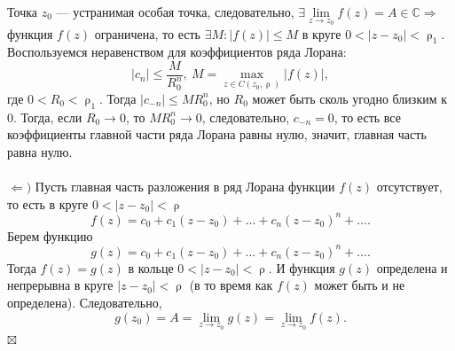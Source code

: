 \documentclass[a4paper, 12pt]{article}
\newenvironment{Proof} %
{\par\noindent{$\blacklozenge$}} %
{\hfill$\scriptstyle\boxtimes$}
\newcommand{\Cm}{\mathbb{C}}
\renewcommand{\leq}{\leqslant}
\renewcommand{\rho}{\uprho}
\begin{document}
\begin{enumerate}
\begin{Proof}
	Точка $z_0$ --- устранимая особая точка, следовательно, $\exists \lim\limits_{z\to z_0} f(z) = A\in \Cm\Rightarrow$ функция $f(z)$ ограничена, то есть $\exists M : |f(z)|\leq M$ в круге $0 < |z-z_0| < \rho _1$. Воспользуемся неравенством для коэффициентов ряда Лорана:
	$$|c_n|\leq \dfrac{M}{R_0^n},\ M = \underset{z \in C(z_0,\rho)}{\max} |f(z)|,$$
	где $0 < R_0 < \rho_1$. Тогда $|c_{-n}| \leq MR_0^n$, но $R_0$ может быть сколь угодно близким к 0. Тогда, если $R_0\to 0$, то $MR_0^n \to 0$, следовательно, $c_{-n} = 0$, то есть все коэффициенты главной части ряда Лорана равны нулю, значит, главная часть равна нулю.\\\\
	$\Leftarrow)$ Пусть главная часть разложения в ряд Лорана функции $f(z)$ отсутствует, то есть в круге $0 < |z-z_0|<\rho$ $$f(z) = c_0 + c_1(z-z_0) +\ldots + c_n(z-z_0)^n + \ldots.$$
	Берем функцию $$g(z) = c_0 + c_1(z-z_0) +\ldots + c_n(z-z_0)^n + \ldots.$$ Тогда $f(z) = g(z)$ в кольце $0 < |z-z_0|<\rho$. И функция $g(z)$ определена и непрерывна в круге $|z-z_0| < \rho$ (в то время как $f(z)$ может быть и не определена). Следовательно, $$g(z_0) = A = \lim\limits_{z\to z_0} g(z) = \lim\limits_{z\to z_0}f(z).$$
\end{Proof}
	\end{enumerate}
\end{document}
